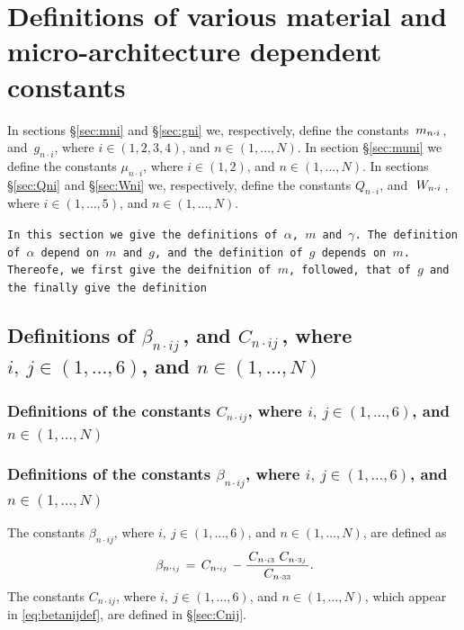 \documentclass[preprint,12pt,times]{elsarticle}
\numberwithin{equation}{section}
\newcommand{\msub}[2]{
\IfEqCase{#2}{
      {i}{\, m_{#1\cdot #2}\,}%
  }[\,m_{#1\cdot {\scriptscriptstyle #2}}\,]}
\newcommand{\gsub}[2]{g_{#1\cdot #2}}
\newcommand{\Qsub}[2]{Q_{#1\cdot #2}}
\newcommand{\Wsub}[2]{
\IfEqCase{#2}{
      {i}{\, W_{#1\cdot #2}\,}%
  }[\,W_{#1\cdot {\scriptscriptstyle #2}}\,]}
\newcommand{\musub}[2]{\mu_{#1\cdot #2}}
\newcommand{\betasub}[2]{
\IfEqCase{#2}{
       {xxxx}{\,\beta_{ {#1}\cdot { #2}}\,}%
   }[\,\beta_{ {#1}\cdot {\scriptscriptstyle #2}}\,]}
\newcommand{\Csub}[2]{
   \IfEqCase{#2}{
          {xxxx}{\,\beta_{ {#1}\cdot { #2}}\,}%
      }[\,C_{ {#1}\cdot {\scriptscriptstyle #2}}\,]}
\newcommand{\insix}{\in(1,\ldots,6)}
\newcommand{\inN}{\in(1,\ldots,N)}
\renewcommand{\>}{$\Rightarrow$}
\begin{document}
\newpage
\appendix

\section{Definitions of various material and micro-architecture dependent constants}
\label{Appen:MatConst}



In sections \S\ref{sec:mni} and \S\ref{sec:gni} we, respectively, define the constants $\msub{n}{i}$, and~$\gsub{n}{i}$, where $i\in (1,2,3,4)$, and $n\in(1,\ldots,N)$. In section \S\ref{sec:muni} we define the constants $\musub{n}{i}$, where $i\in (1,2)$, and $n\in(1,\ldots,N)$. In sections \S\ref{sec:Qni} and \S\ref{sec:Wni} we, respectively, define the constants $\Qsub{n}{i}$, and~$\Wsub{n}{i}$, where $i\in (1,\ldots,5)$, and $n\in(1,\ldots,N)$.


\texttt{In this section we give the definitions of $\alpha$, $m$ and $\gamma$. The definition of $\alpha$ depend on $m$ and $g$, and the definition of $g$ depends on $m$. Thereofe, we first give the deifnition of $m$, followed, that of $g$ and the finally give the definition}


\subsection{Definitions of  $\beta_{n\cdot i j}\,$, and $C_{n\cdot i j}\,$, where $i,~j\insix$, and $n\inN$\label{sec:betaCnij}}

\subsubsection{Definitions of the constants $C_{n\cdot i j}$, where $i,~j\insix$, and $n\inN$\label{sec:Cnij}}%



\subsubsection{Definitions of the constants $\beta_{n\cdot i j}$, where $i,~j\insix$, and $n\inN$\label{sec:betaCnij}\label{sec:betanij}}

The constants $\beta_{n\cdot i j}$, where $i,~j\insix$, and $n\inN$, are defined as
\begin{equation}
\betasub{n}{ij} = \Csub{n}{ij}-\frac{\Csub{n}{i3} \Csub{n}{3j}}{\Csub{n}{33}}.
\label{eq:betanijdef}
\end{equation} %
The constants $C_{n\cdot i j}$, where $i,~j\insix$, and $n\inN$, which appear in \eqref{eq:betanijdef}, are defined in \S\ref{sec:Cnij}. %
\end{document}
